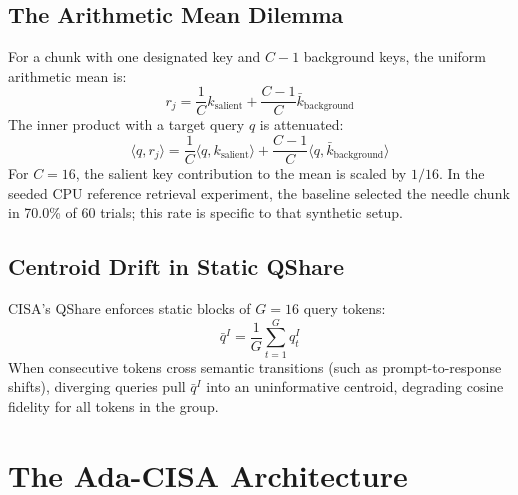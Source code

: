 \documentclass[10pt,twocolumn]{article}
\begin{document}
\subsection{The Arithmetic Mean Dilemma}
For a chunk with one designated key and $C-1$ background keys, the uniform arithmetic mean is:
\begin{equation}
r_j = \frac{1}{C} k_{\text{salient}} + \frac{C-1}{C} \bar{k}_{\text{background}}
\end{equation}
The inner product with a target query $q$ is attenuated:
\begin{equation}
\langle q, r_j \rangle = \frac{1}{C} \langle q, k_{\text{salient}} \rangle + \frac{C-1}{C} \langle q, \bar{k}_{\text{background}} \rangle
\end{equation}
For $C=16$, the salient key contribution to the mean is scaled by $1/16$. In the seeded CPU reference retrieval experiment, the baseline selected the needle chunk in 70.0\% of 60 trials; this rate is specific to that synthetic setup.

\subsection{Centroid Drift in Static QShare}
CISA's QShare enforces static blocks of $G=16$ query tokens:
\begin{equation}
\bar{q}^I = \frac{1}{G}\sum_{t=1}^G q_t^I
\end{equation}
When consecutive tokens cross semantic transitions (such as prompt-to-response shifts), diverging queries pull $\bar{q}^I$ into an uninformative centroid, degrading cosine fidelity for all tokens in the group.

\section{The Ada-CISA Architecture}
\end{document}
